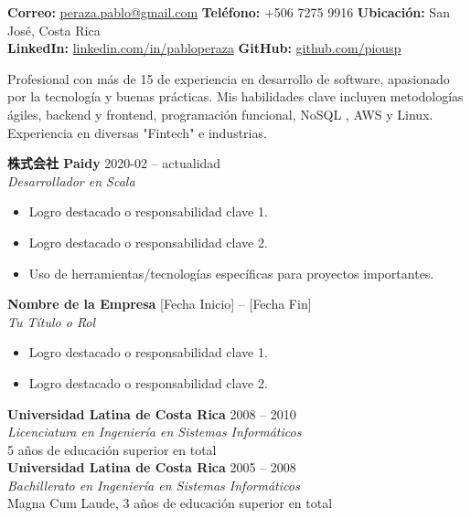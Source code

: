 \centering
	\textbf{Correo:} \href{mailto:peraza.pablo@gmail.com}{peraza.pablo@gmail.com} \quad
	\textbf{Teléfono:} +506 7275 9916\quad
	\textbf{Ubicación:} San José, Costa Rica\\
	\textbf{LinkedIn:} \href{https://linkedin.com/in/pabloperaza}{linkedin.com/in/pabloperaza} \quad
	\textbf{GitHub:} \href{https://github.com/piousp}{github.com/piousp} 
	\par
	\vspace{10pt}
	
	Profesional con más de 15 de experiencia en desarrollo de software, apasionado por la tecnología y buenas prácticas. Mis habilidades clave incluyen metodologías ágiles, backend y frontend, programación funcional, NoSQL , AWS y Linux. Experiencia en diversas "Fintech" e industrias.
	
	\textbf{株式会社 Paidy} \hfill 2020-02 -- actualidad \\
	\emph{Desarrollador en Scala} \\
	\begin{itemize}[leftmargin=*]
		\item Logro destacado o responsabilidad clave 1.
		\item Logro destacado o responsabilidad clave 2.
		\item Uso de herramientas/tecnologías específicas para proyectos importantes.
	\end{itemize}
	
	\textbf{Nombre de la Empresa} \hfill [Fecha Inicio] -- [Fecha Fin] \\
	\emph{Tu Título o Rol} \\
	\begin{itemize}[leftmargin=*]
		\item Logro destacado o responsabilidad clave 1.
		\item Logro destacado o responsabilidad clave 2.
	\end{itemize}
	
	\textbf{Universidad Latina de Costa Rica} \hfill 2008 -- 2010 \\
	\emph{Licenciatura en Ingeniería en Sistemas Informáticos} \\
	5 años de educación superior en total \\
	
	\textbf{Universidad Latina de Costa Rica} \hfill 2005 -- 2008 \\
	\emph{Bachillerato en Ingeniería en Sistemas Informáticos} \\
	Magna Cum Laude, 3 años de educación superior en total
	
